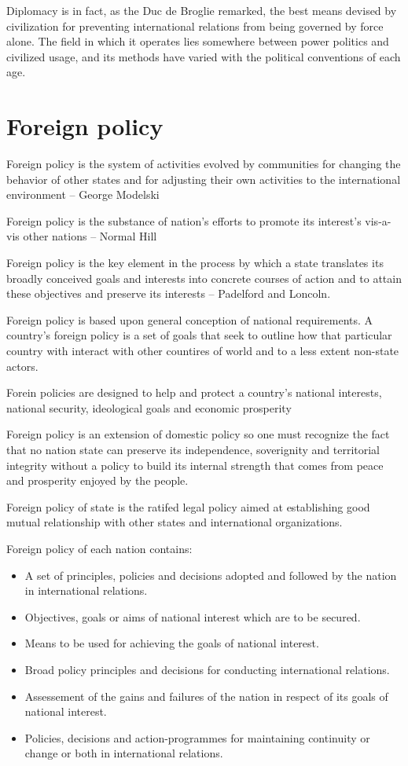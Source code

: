 \documentclass[
  openany]{book}
\providecommand{\tightlist}{%
  \setlength{\itemsep}{0pt}\setlength{\parskip}{0pt}}
\begin{document}
Diplomacy is in fact, as the Duc de Broglie remarked, the best means devised by civilization for preventing international relations from being governed by force alone. The field in which it operates lies somewhere between power politics and civilized usage, and its methods have varied with the political conventions of each age.

\hypertarget{foreign-policy}{%
\section{Foreign policy}\label{foreign-policy}}

Foreign policy is the system of activities evolved by communities for changing the behavior of other states and for adjusting their own activities to the international environment -- George Modelski

Foreign policy is the substance of nation's efforts to promote its interest's vis-a-vis other nations -- Normal Hill

Foreign policy is the key element in the process by which a state translates its broadly conceived goals and interests into concrete courses of action and to attain these objectives and preserve its interests -- Padelford and Loncoln.

Foreign policy is based upon general conception of national requirements. A country's foreign policy is a set of goals that seek to outline how that particular country with interact with other countires of world and to a less extent non-state actors.

Forein policies are designed to help and protect a country's national interests, national security, ideological goals and economic prosperity

Foreign policy is an extension of domestic policy so one must recognize the fact that no nation state can preserve its independence, soverignity and territorial integrity without a policy to build its internal strength that comes from peace and prosperity enjoyed by the people.

Foreign policy of state is the ratifed legal policy aimed at establishing good mutual relationship with other states and international organizations.

Foreign policy of each nation contains:

\begin{itemize}
\tightlist
\item
  A set of principles, policies and decisions adopted and followed by the nation in international relations.
\item
  Objectives, goals or aims of national interest which are to be secured.
\item
  Means to be used for achieving the goals of national interest.
\item
  Broad policy principles and decisions for conducting international relations.
\item
  Assessement of the gains and failures of the nation in respect of its goals of national interest.
\item
  Policies, decisions and action-programmes for maintaining continuity or change or both in international relations.
\end{itemize}
\end{document}
